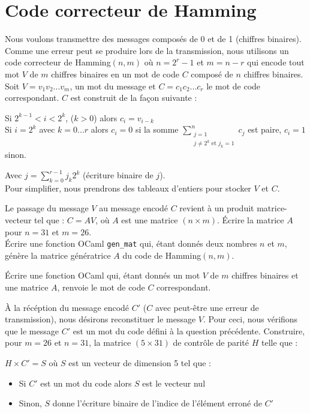 \renewcommand{\SourceFile}{2-jouer-avec-les-mots/src/2-7.ml}

\section{Code correcteur de Hamming}

Nous voulons transmettre des messages composés de 0 et de 1 (chiffres binaires). Comme une erreur peut se produire lors de la transmission, nous utilisons un code correcteur de Hamming$(n,m)$ où $n=2^r-1$ et $m=n-r$ qui encode tout mot $V$ de $m$ chiffres binaires en un mot de code $C$ composé de $n$ chiffres binaires. Soit $V=v_1v_2...v_m$, un mot du message et $C=c_1c_2...c_r$ le mot de code correspondant. $C$ est construit de la façon suivante :
\medskip

Si $2^{k-1} < i < 2^{k}$, ($k > 0$) alors $c_i=v_{i-k}$\\
Si $i=2^k$ avec $k=0...r$ alors $c_i=0$ si la somme $\displaystyle\sum_{\substack{j=1\\ j \neq 2^k \textrm{ et } j_k=1}}^{n}c_j$ est paire, $c_i=1$ sinon.

Avec $\displaystyle j=\sum_{k=0}^{r-1}j_k2^k$ (écriture binaire de $j$).\\
Pour simplifier, nous prendrons des tableaux d'entiers pour stocker $V$ et $C$.

\Q
Le passage du message $V$ au message encodé $C$ revient à un produit matrice-vecteur tel que : $C=AV$, où $A$ est une matrice $(n \times m)$. Écrire la matrice $A$ pour $n=31$ et $m=26$.\\
Écrire une fonction OCaml \texttt{gen\_mat} qui, étant donnés deux nombres $n$ et $m$, génère la matrice génératrice $A$ du code de Hamming$(n,m)$.

\Q
Écrire une fonction OCaml qui, étant donnés un mot $V$ de $m$ chiffres binaires et une matrice $A$, renvoie le mot de code $C$ correspondant.

\Q
À la récéption du message encodé $C'$ ($C$ avec peut-être une erreur de transmission), nous désirons reconstituer le message $V$. Pour ceci, nous vérifions que le message $C'$ est un mot du code défini à la question précédente. Construire, pour $m=26$ et $n=31$, la matrice $(5 \times 31)$ de contrôle de parité $H$ telle que :
\medskip

$H \times C' = S$ où $S$ est un vecteur de dimension 5 tel que :
\begin{itemize}
    \item Si $C'$ est un mot du code alors $S$ est le vecteur nul
    \item Sinon, $S$ donne l'écriture binaire de l'indice de l'élément erroné de $C'$
\end{itemize}
\medskip

